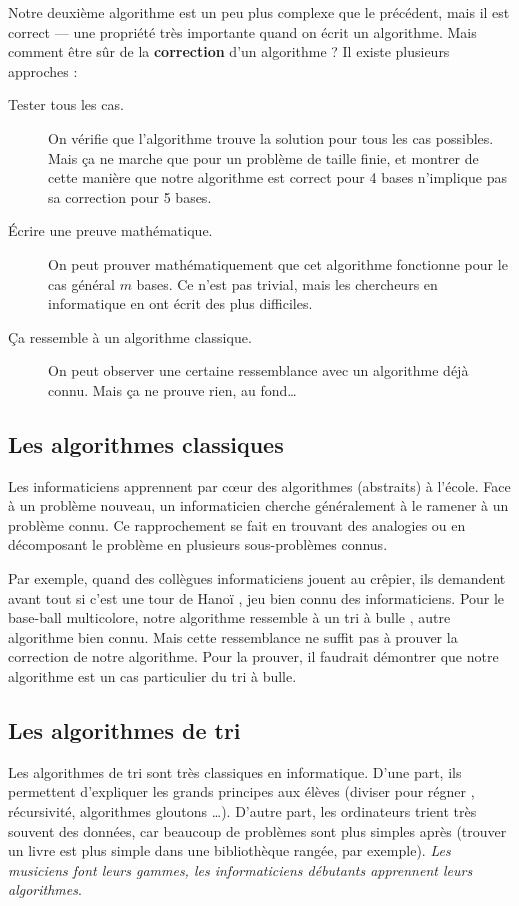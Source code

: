 Notre deuxième algorithme est un peu plus complexe que le précédent, mais il est
correct --- une propriété très importante quand on écrit un algorithme. Mais
comment être sûr de la \textbf{correction} d'un algorithme ? Il existe plusieurs
approches :

\begin{description}
\item[Tester tous les cas.] On vérifie que l'algorithme trouve la solution pour
  tous les cas possibles. Mais ça ne marche que pour un problème de taille
  finie, et montrer de cette manière que notre algorithme est correct pour 4
  bases n'implique pas sa correction pour 5 bases.
\item[Écrire une preuve mathématique.] On peut prouver mathématiquement que cet
  algorithme fonctionne pour le cas général $m$ bases. Ce n'est pas trivial,
  mais les chercheurs en informatique en ont écrit des plus difficiles.
\item[Ça ressemble à un algorithme classique.] On peut observer une certaine
  ressemblance avec un algorithme déjà connu. Mais ça ne prouve rien, au
  fond{\ldots}
\end{description}

\subsection*{Les algorithmes classiques}

Les informaticiens apprennent par c\oe{}ur des algorithmes (abstraits) à
l'école. Face à un problème nouveau, un informaticien cherche généralement à le
ramener à un problème connu. Ce rapprochement se fait en trouvant des analogies
ou en décomposant le problème en plusieurs sous-problèmes connus.

Par exemple, quand des collègues informaticiens jouent au crêpier, ils demandent
avant tout si c'est \og une tour de Hanoï \fg, jeu bien connu des
informaticiens. Pour le base-ball multicolore, notre algorithme ressemble à un
\og tri à bulle \fg, autre algorithme bien connu. Mais cette ressemblance ne
suffit pas à prouver la correction de notre algorithme. Pour la prouver, il
faudrait démontrer que notre algorithme est un cas particulier du tri à bulle.
 
\subsection*{Les algorithmes de tri}

Les algorithmes de tri sont très classiques en informatique. D'une part, ils
permettent d'expliquer les grands principes aux élèves (\og diviser pour régner
\fg, récursivité, algorithmes gloutons {\ldots}). D'autre part, les ordinateurs
trient très souvent des données, car beaucoup de problèmes sont plus simples
après (trouver un livre est plus simple dans une bibliothèque rangée, par
exemple). \textit{Les musiciens font leurs gammes, les informaticiens débutants
  apprennent leurs algorithmes}.

